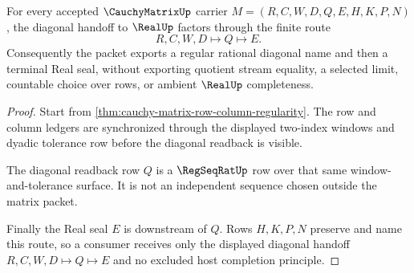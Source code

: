 \begin{theorem}
\label{thm:cauchy-matrix-diagonal-real-handoff}
For every accepted $\CauchyMatrixUp$ carrier $M=(R,C,W,D,Q,E,H,K,P,N)$, the diagonal handoff to $\RealUp$ factors through the finite route
$$
R,C,W,D \longmapsto Q \longmapsto E .
$$
Consequently the packet exports a regular rational diagonal name and then a terminal Real seal, without exporting quotient stream equality, a selected limit, countable choice over rows, or ambient $\RealUp$ completeness.
\end{theorem}
\begin{proof}
Start from \autoref{thm:cauchy-matrix-row-column-regularity}. The row and column ledgers are synchronized through the displayed two-index windows and dyadic tolerance row before the diagonal readback is visible.

The diagonal readback row $Q$ is a $\RegSeqRatUp$ row over that same window-and-tolerance surface. It is not an independent sequence chosen outside the matrix packet.

Finally the Real seal $E$ is downstream of $Q$. Rows $H,K,P,N$ preserve and name this route, so a consumer receives only the displayed diagonal handoff $R,C,W,D \mapsto Q \mapsto E$ and no excluded host completion principle.
\end{proof}




